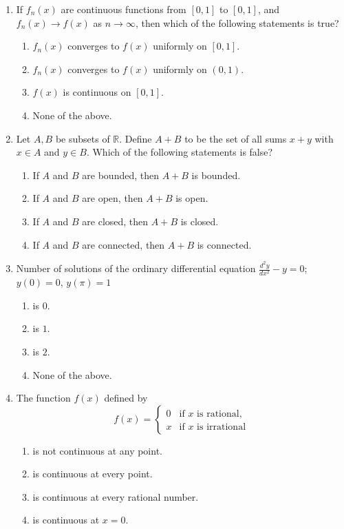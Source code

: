 \documentclass[11pt, a4paper]{article}
\begin{document}
\begin{enumerate}
  \item If $f_n(x)$ are continuous functions from $[0, 1]$ to $[0, 1]$, and $f_n(x) \to f(x)$ as $n \to \infty$, then which of the following statements is true?
  \begin{enumerate}[label=(\alph*)]
    \item $f_n(x)$ converges to $f(x)$ uniformly on $[0, 1]$.
    \item $f_n(x)$ converges to $f(x)$ uniformly on $(0, 1)$.
    \item $f(x)$ is continuous on $[0, 1]$.
    \item None of the above.
  \end{enumerate}

  \item Let $A, B$ be subsets of $\mathbb{R}$. Define $A + B$ to be the set of all sums $x + y$ with $x \in A$ and $y \in B$. Which of the following statements is false?
  \begin{enumerate}[label=(\alph*)]
    \item If $A$ and $B$ are bounded, then $A + B$ is bounded.
    \item If $A$ and $B$ are open, then $A + B$ is open.
    \item If $A$ and $B$ are closed, then $A + B$ is closed.
    \item If $A$ and $B$ are connected, then $A + B$ is connected.
  \end{enumerate}

  \item Number of solutions of the ordinary differential equation $\displaystyle \frac{d^2 y}{dx^2} - y = 0$; $y(0) = 0$, $y(\pi) = 1$
  \begin{enumerate}[label=(\alph*)]
    \item is $0$.
    \item is $1$.
    \item is $2$.
    \item None of the above.
  \end{enumerate}

  \item The function $f(x)$ defined by
  \[
    f(x) = \begin{cases} 0 & \text{if } x \text{ is rational,} \\ x & \text{if } x \text{ is irrational} \end{cases}
  \]
  \begin{enumerate}[label=(\alph*)]
    \item is not continuous at any point.
    \item is continuous at every point.
    \item is continuous at every rational number.
    \item is continuous at $x = 0$.
  \end{enumerate}


\end{enumerate}
\end{document}
